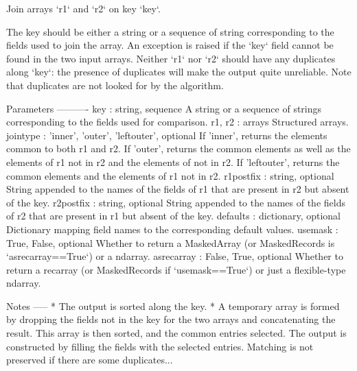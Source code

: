 \begin{DoxyVerb}Join arrays `r1` and `r2` on key `key`.

The key should be either a string or a sequence of string corresponding
to the fields used to join the array.  An exception is raised if the
`key` field cannot be found in the two input arrays.  Neither `r1` nor
`r2` should have any duplicates along `key`: the presence of duplicates
will make the output quite unreliable. Note that duplicates are not
looked for by the algorithm.

Parameters
----------
key : {string, sequence}
    A string or a sequence of strings corresponding to the fields used
    for comparison.
r1, r2 : arrays
    Structured arrays.
jointype : {'inner', 'outer', 'leftouter'}, optional
    If 'inner', returns the elements common to both r1 and r2.
    If 'outer', returns the common elements as well as the elements of
    r1 not in r2 and the elements of not in r2.
    If 'leftouter', returns the common elements and the elements of r1
    not in r2.
r1postfix : string, optional
    String appended to the names of the fields of r1 that are present
    in r2 but absent of the key.
r2postfix : string, optional
    String appended to the names of the fields of r2 that are present
    in r1 but absent of the key.
defaults : {dictionary}, optional
    Dictionary mapping field names to the corresponding default values.
usemask : {True, False}, optional
    Whether to return a MaskedArray (or MaskedRecords is
    `asrecarray==True`) or a ndarray.
asrecarray : {False, True}, optional
    Whether to return a recarray (or MaskedRecords if `usemask==True`)
    or just a flexible-type ndarray.

Notes
-----
* The output is sorted along the key.
* A temporary array is formed by dropping the fields not in the key for
  the two arrays and concatenating the result. This array is then
  sorted, and the common entries selected. The output is constructed by
  filling the fields with the selected entries. Matching is not
  preserved if there are some duplicates...\end{DoxyVerb}
 \mbox{\label{namespacenumpy_1_1lib_1_1recfunctions_a5fb7c301da028b4334869427b9832c10}} 

